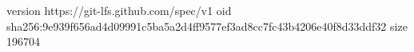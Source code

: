 version https://git-lfs.github.com/spec/v1
oid sha256:9e939f656ad4d09991c5ba5a2d4ff9577ef3ad8cc7fc43b4206e40f8d33ddf32
size 196704
